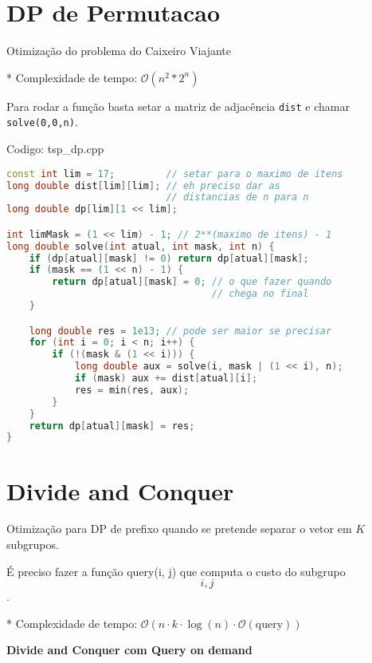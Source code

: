 \documentclass[10pt, a4paper, oneside]{book}
\begin{document}
\section{DP de Permutacao}


Otimização do problema do Caixeiro Viajante



* Complexidade de tempo: $\mathcal{O}(n^2 * 2^n)$



Para rodar a função basta setar a matriz de adjacência \texttt{dist} e chamar \texttt{solve(0,0,n)}.

\hfill

Codigo: tsp\_dp.cpp

\begin{lstlisting}[language=C++]
const int lim = 17;         // setar para o maximo de itens
long double dist[lim][lim]; // eh preciso dar as
                            // distancias de n para n
long double dp[lim][1 << lim];

int limMask = (1 << lim) - 1; // 2**(maximo de itens) - 1
long double solve(int atual, int mask, int n) {
    if (dp[atual][mask] != 0) return dp[atual][mask];
    if (mask == (1 << n) - 1) {
        return dp[atual][mask] = 0; // o que fazer quando
                                    // chega no final
    }

    long double res = 1e13; // pode ser maior se precisar
    for (int i = 0; i < n; i++) {
        if (!(mask & (1 << i))) {
            long double aux = solve(i, mask | (1 << i), n);
            if (mask) aux += dist[atual][i];
            res = min(res, aux);
        }
    }
    return dp[atual][mask] = res;
}
\end{lstlisting}
\hfill

\section{Divide and Conquer}


Otimização para DP de prefixo quando se pretende separar o vetor em $K$ subgrupos.    



É preciso fazer a função query(i, j) que computa o custo do subgrupo \[i, j\].

* Complexidade de tempo: $\mathcal{O}(n \cdot k \cdot \log(n) \cdot  \mathcal{O}(\text{query}))$



\textbf{Divide and Conquer com Query on demand} 
\end{document}
